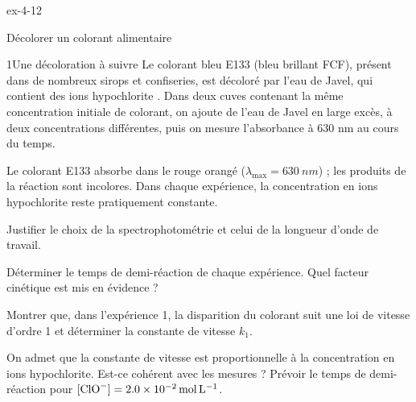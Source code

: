 \begin{blocLivre}{ex-4-12}
\begin{exercice}[3]{Décolorer un colorant alimentaire}
\begin{docu}{1}{Une décoloration à suivre}
Le colorant bleu E133 (bleu brillant FCF), présent dans de nombreux sirops et confiseries, est décoloré par l'eau de
Javel, qui contient des ions hypochlorite . Dans deux cuves contenant la même concentration initiale de
colorant, on ajoute de l'eau de Javel en large excès, à deux concentrations différentes, puis on mesure l'absorbance
à 630 nm au cours du temps.
\end{docu}
\begin{donnees}
Le colorant E133 absorbe dans le rouge orangé ($\lambda_{\max}=\qty{630}{nm}$) ; les produits de la réaction sont
incolores. Dans chaque expérience, la concentration en ions hypochlorite reste pratiquement constante.
\end{donnees}
\begin{questions}
\item Justifier le choix de la spectrophotométrie et celui de la longueur d'onde de travail.
\item Déterminer le temps de demi-réaction de chaque expérience. Quel facteur cinétique est mis en évidence ?
\item \initiative Montrer que, dans l'expérience 1, la disparition du colorant suit une loi de vitesse d'ordre 1 et
déterminer la constante de vitesse $k_1$.
\item On admet que la constante de vitesse est proportionnelle à la concentration en ions hypochlorite. Est-ce cohérent
avec les mesures ? Prévoir le temps de demi-réaction pour \mbox{$[\ce{ClO-}]=\qty{2,0e-2}{mol.L^{-1}}$}.
\end{questions}
\end{exercice}
\end{blocLivre}
